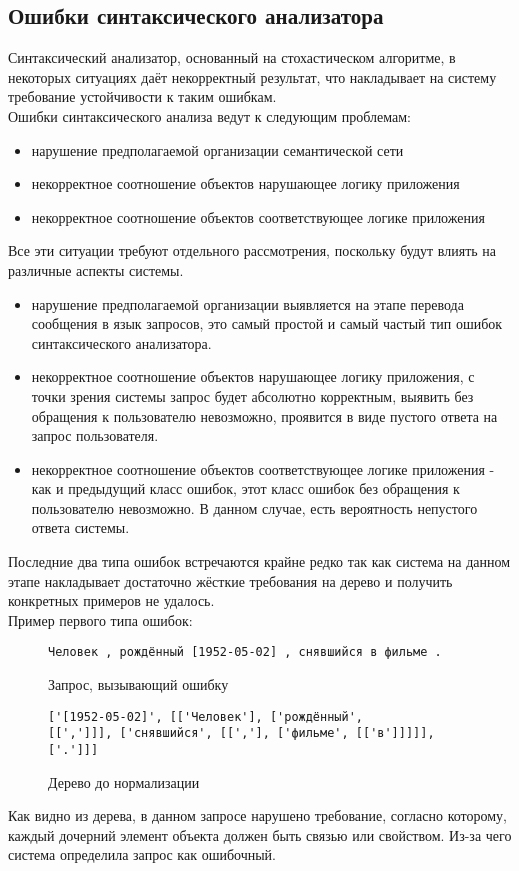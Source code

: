 \subsection{Ошибки синтаксического анализатора}
Синтаксический анализатор, основанный на стохастическом алгоритме, в некоторых ситуациях даёт некорректный результат, что накладывает на систему требование устойчивости к таким ошибкам.\\
Ошибки синтаксического анализа ведут к следующим  проблемам:
\begin{itemize}
\item нарушение предполагаемой организации семантической сети
\item некорректное соотношение объектов нарушающее логику приложения
\item некорректное соотношение объектов соответствующее логике приложения
\end{itemize}
Все эти ситуации требуют отдельного рассмотрения, поскольку будут влиять на различные аспекты системы.
\begin{itemize}
\item нарушение предполагаемой организации выявляется на этапе перевода сообщения в язык запросов, это самый простой и самый частый тип ошибок синтаксического анализатора.
\item некорректное соотношение объектов нарушающее логику приложения, с точки зрения системы запрос будет абсолютно корректным, выявить без обращения к пользователю невозможно, проявится в виде пустого ответа на запрос пользователя.
\item некорректное соотношение объектов соответствующее логике приложения - как и предыдущий класс ошибок, этот класс ошибок без обращения к пользователю невозможно. В данном случае, есть вероятность непустого ответа системы.
\end{itemize}
Последние два типа ошибок встречаются крайне редко так как система на данном этапе накладывает достаточно жёсткие требования на дерево и получить конкретных примеров не удалось.\\
Пример первого типа ошибок:
\begin{figure}[!h]
\begin{tcolorbox}[colback=white, sharpish corners]
\begin{verbatim}
Человек , рождённый [1952-05-02] , снявшийся в фильме .
\end{verbatim}
\end{tcolorbox}
\caption{Запрос, вызывающий ошибку}
\end{figure}
\begin{figure}[!h]
\begin{tcolorbox}[colback=white, sharpish corners]
\begin{verbatim}
['[1952-05-02]', [['Человек'], ['рождённый', 
[[',']]], ['снявшийся', [[','], ['фильме', [['в']]]]], ['.']]]
\end{verbatim}
\end{tcolorbox}
\caption{Дерево до нормализации}
\end{figure}
Как видно из дерева, в данном запросе нарушено требование, согласно которому, каждый дочерний элемент объекта должен быть связью или свойством. Из-за чего система определила запрос как ошибочный.
